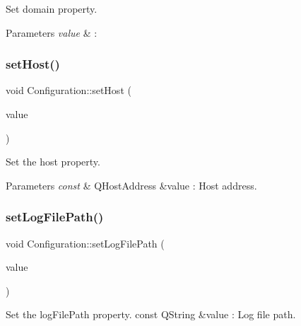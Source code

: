 Set domain property. 


\begin{DoxyParams}{Parameters}
{\em value} & \+: \\
\hline
\end{DoxyParams}
\mbox{\label{class_configuration_a0851c4f93476b80acebd88204c4a86c6}} 
\subsubsection{\texorpdfstring{set\+Host()}{setHost()}}
{\footnotesize\ttfamily void Configuration\+::set\+Host (\begin{DoxyParamCaption}\item[{const Q\+Host\+Address \&}]{value }\end{DoxyParamCaption})}



Set the host property. 


\begin{DoxyParams}{Parameters}
{\em const} & Q\+Host\+Address \&value \+: Host address. \\
\hline
\end{DoxyParams}
\mbox{\label{class_configuration_a83269c31da560355e67fdf452f7e24b0}} 
\subsubsection{\texorpdfstring{set\+Log\+File\+Path()}{setLogFilePath()}}
{\footnotesize\ttfamily void Configuration\+::set\+Log\+File\+Path (\begin{DoxyParamCaption}\item[{const Q\+String \&}]{value }\end{DoxyParamCaption})}



Set the log\+File\+Path property. const Q\+String \&value \+: Log file path. 

\mbox{\label{class_configuration_a3c26bb11f458d7374fd4c5b53e181aee}} 
